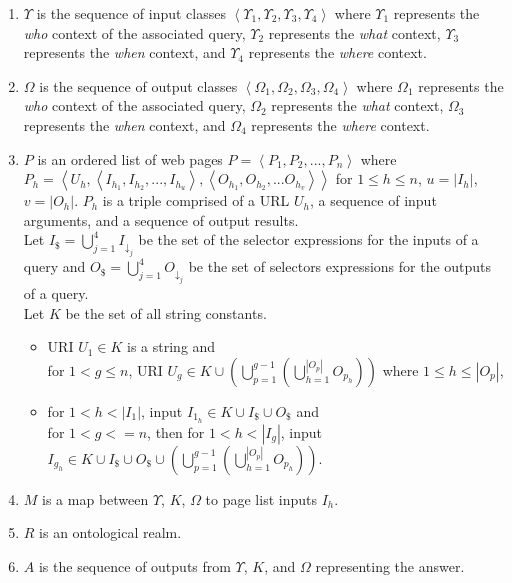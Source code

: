 \documentclass{www2010-submission}
\begin{document}
\begin{enumerate}

\item $\Upsilon$ is the sequence of input classes $\left< \Upsilon_{1}, \Upsilon_{2}, \Upsilon_{3}, \Upsilon_{4} \right>$ where $\Upsilon_{1}$ represents the \emph{who} context of the associated query, $\Upsilon_{2}$ represents the \emph{what} context, $\Upsilon_{3}$ represents the \emph{when} context, and $\Upsilon_{4}$ represents the \emph{where} context.

\item $\Omega$ is the sequence of output classes $\left<\Omega_{1}, \Omega_{2}, \Omega_{3}, \Omega_{4}\right>$ where $\Omega_{1}$ represents the \emph{who} context of the associated query, $\Omega_{2}$ represents the \emph{what} context, $\Omega_{3}$ represents the \emph{when} context, and $\Omega_{4}$ represents the \emph{where} context.

\item $P$ is an ordered list of web pages $P = \left<P_1,P_2,..., P_n\right>$ where $P_h = \left<U_h,\left<I_{h_1},I_{h_2},...,I_{h_u}\right>,\left<O_{h_1},O_{h_2},...O_{h_v}\right>\right>$ for $1 \leq h \leq n$, $u = \left| I_h \right|$, $v = \left| O_h \right|$. $P_h$ is a triple comprised of a URL $U_h$, a sequence of input arguments, and a sequence of output results.
\\
Let $I_{\$} = \bigcup_{j=1}^{4} I_{\downarrow_j}$ be the set of the selector expressions for the inputs of a query and $O_{\$} = \bigcup_{j=1}^{4} O_{\downarrow_j}$ be the set of selectors expressions for the outputs of a query.
\\
Let $K$ be the set of all string constants.
\begin{itemize}
\item URI $U_1 \in K$ is a string and \\
for $1 < g \leq n$, URI $U_g \in K \cup \left( \bigcup^{g-1}_{p=1} \left( \bigcup^{\left|O_p\right|}_{h=1}O_{p_h} \right)\right)$ where $1 \leq h \leq \left| O_p \right| $,

\item for $1 < h < \left| I_1 \right|$, input $I_{1_h} \in K \cup I_{\$} \cup O_{\$}$ and \\
for $1 < g <= n$, then for $1 < h < \left| I_g \right|$, input $I_{g_h} \in K \cup I_{\$} \cup O_{\$} \cup \left( \bigcup^{g-1}_{p=1} \left( \bigcup^{\left|O_p\right|}_{h=1}O_{p_h} \right)\right)$.
\end{itemize}

\item $M$ is a map between $\Upsilon$, $K$, $\Omega$ to page list inputs $I_h$.

\item $R$ is an ontological realm. 

\item $A$ is the sequence of outputs from $\Upsilon$, $K$, and $\Omega$ representing the answer.

\end{enumerate}
\end{document}
